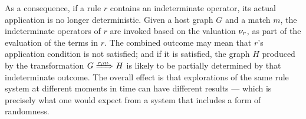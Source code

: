 As a consequence, if a rule $r$ contains an indeterminate operator, its actual application is no longer deterministic. Given a host graph $G$ and a match $m$, the indeterminate operators of $r$ are invoked based on the valuation $\nu_r$, as part of the evaluation of the terms in $r$. The combined outcome may mean that $r$'s application condition is not satisfied; and if it is satisfied, the graph $H$ produced by the transformation $G\Trans{r,m} H$ is likely to be partially determined by that indeterminate outcome. The overall effect is that explorations of the same rule system at different moments in time can have different results --- which is precisely what one would expect from a system that includes a form of randomness.
